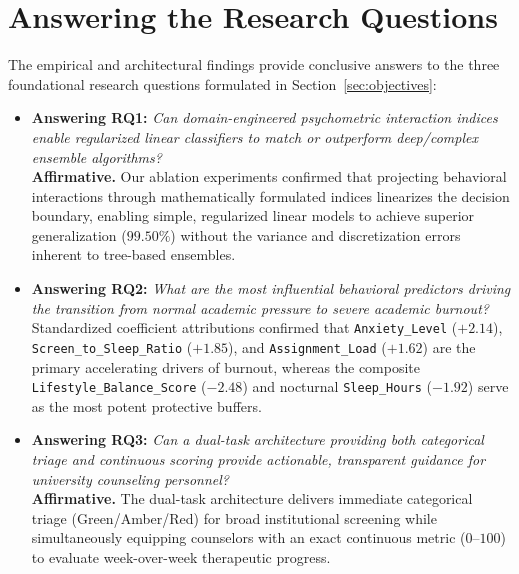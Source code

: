\documentclass[12pt,a4paper,oneside]{report}
\begin{document}
\section{Answering the Research Questions}
\label{sec:answering_rqs}
The empirical and architectural findings provide conclusive answers to the three foundational research questions formulated in Section~\ref{sec:objectives}:
\begin{itemize}
    \item \textbf{Answering RQ1:} \emph{Can domain-engineered psychometric interaction indices enable regularized linear classifiers to match or outperform deep/complex ensemble algorithms?} \\
    \textbf{Affirmative.} Our ablation experiments confirmed that projecting behavioral interactions through mathematically formulated indices linearizes the decision boundary, enabling simple, regularized linear models to achieve superior generalization ($99.50\%$) without the variance and discretization errors inherent to tree-based ensembles.
    \item \textbf{Answering RQ2:} \emph{What are the most influential behavioral predictors driving the transition from normal academic pressure to severe academic burnout?} \\
    Standardized coefficient attributions confirmed that \texttt{Anxiety\_Level} ($+2.14$), \texttt{Screen\_to\_Sleep\_Ratio} ($+1.85$), and \texttt{Assignment\_Load} ($+1.62$) are the primary accelerating drivers of burnout, whereas the composite \texttt{Lifestyle\_Balance\_Score} ($-2.48$) and nocturnal \texttt{Sleep\_Hours} ($-1.92$) serve as the most potent protective buffers.
    \item \textbf{Answering RQ3:} \emph{Can a dual-task architecture providing both categorical triage and continuous scoring provide actionable, transparent guidance for university counseling personnel?} \\
    \textbf{Affirmative.} The dual-task architecture delivers immediate categorical triage (Green/Amber/Red) for broad institutional screening while simultaneously equipping counselors with an exact continuous metric ($0$--$100$) to evaluate week-over-week therapeutic progress.
\end{itemize}
\end{document}
